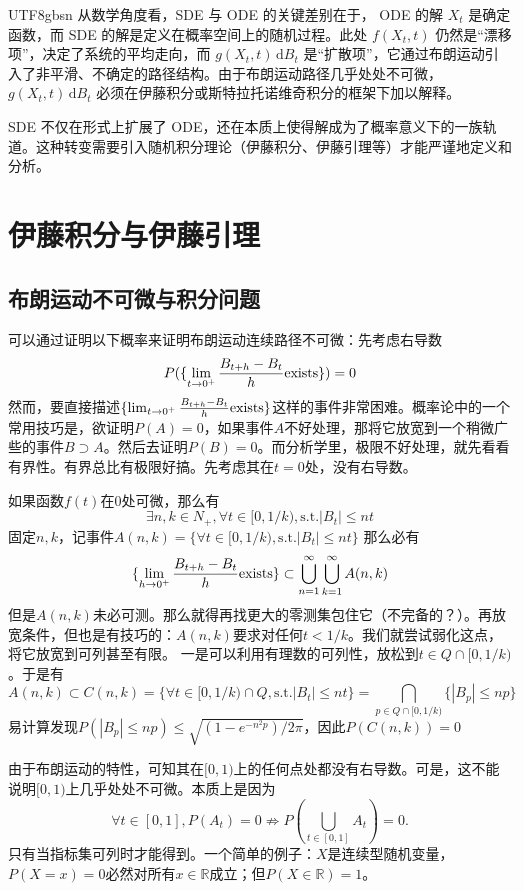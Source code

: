 \documentclass{article}
\begin{document}
\begin{CJK*}{UTF8}{gbsn}
\medskip
从数学角度看，SDE 与 ODE 的关键差别在于， ODE 的解 $X_t$ 是确定函数，而 SDE 的解是定义在概率空间上的随机过程。此处 $f(X_t,t)$ 仍然是“漂移项”，决定了系统的平均走向，而 $g(X_t,t)\,\mathrm{d}B_t$ 是“扩散项”，它通过布朗运动引入了非平滑、不确定的路径结构。由于布朗运动路径几乎处处不可微，$g(X_t,t)\,\mathrm{d}B_t$ 必须在伊藤积分或斯特拉托诺维奇积分的框架下加以解释。

SDE 不仅在形式上扩展了 ODE，还在本质上使得解成为了概率意义下的一族轨道。这种转变需要引入随机积分理论（伊藤积分、伊藤引理等）才能严谨地定义和分析。

\section{伊藤积分与伊藤引理}
\subsection{布朗运动不可微与积分问题}
可以通过证明以下概率来证明布朗运动连续路径不可微：先考虑右导数
$$
P(\{\lim_{t\to0^+} \frac{B_{t+h}-B_t}{h}\space\text{exists}\})=0
$$
然而，要直接描述$\{\lim_{t\to0^+} \frac{B_{t+h}-B_t}{h}\space\text{exists}\}$这样的事件非常困难。概率论中的一个常用技巧是，欲证明$P(A)=0$，如果事件$A$不好处理，那将它放宽到一个稍微广些的事件$B\supset A$。然后去证明$P(B)=0$。而分析学里，极限不好处理，就先看看有界性。有界总比有极限好搞。{先考虑其在$t=0$处，没有右导数}。

{如果函数$f(t)$在$0$处可微，那么有}
$$
{\exists n,k\in N_+,\forall t\in[0,1/k),\text{s.t.}|B_t|\le nt
}$$
{固定$n,k$，记事件$A(n,k)=\{\forall t\in[0,1/k),\text{s.t.}|B_t|\le nt\}$
那么必有}
$$
{\{\lim_{h\to0^+} \frac{B_{t+h}-B_t}{h}\space\text{exists}\}\subset
\bigcup_{n=1}^\infty\bigcup_{k=1}^\infty A(n,k)}
$$
{但是$A(n,k)$未必可测。那么就得再找更大的零测集包住它（不完备的？）。}再放宽条件，但也是有技巧的：{$A(n,k)$要求对任何$t<1/k$。}我们就尝试弱化这点，将它放宽到可列甚至有限。
 一是可以利用有理数的可列性，放松到$t\in Q\cap[0,1/k)$。于是有
    $${A(n,k)\subset C(n,k)=\{\forall t\in[0,1/k)\cap Q,\text{s.t.}|B_t|\le nt\}=\bigcap_{p\in Q\cap[0,1/k)}\{|B_p|\le np\} }$$
    {易计算发现$P(|B_p|\le np)\le\sqrt{(1-e^{-n^2p})/2\pi}$，因此$P(C(n,k))=0$}

由于布朗运动的特性，可知其在$[0,1)$上的任何点处都没有右导数。可是，这不能说明$[0,1)$上几乎处处不可微。本质上是因为
$$
\forall t\in[0,1],P(A_t)=0\not\Rightarrow P(\bigcup_{t\in[0,1]}A_t)=0.
$$
只有当指标集可列时才能得到。一个简单的例子：$X$是连续型随机变量，$P(X=x)=0$必然对所有$x\in\mathbb{R}$成立；但$P(X\in\mathbb{R})=1$。


\end{CJK*}
\end{document}
